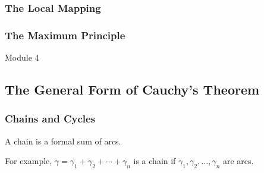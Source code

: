\subsubsection{The Local Mapping}

\subsubsection{The Maximum Principle}
{\Large Module 4 }
\subsection{The General Form of Cauchy's Theorem}
\subsubsection{Chains and Cycles}
\begin{definition}[chain]
	A chain is a formal sum of arcs.
\end{definition}
For example, $\gamma = \gamma_1 + \gamma_2 + \dotsb + \gamma_n$ is a chain if $\gamma_1,\gamma_2,\dots,\gamma_n$ are arcs.
